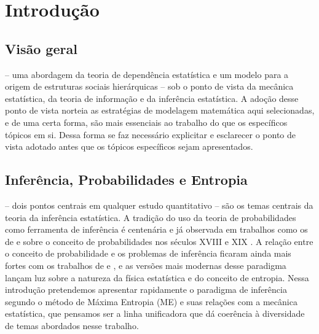 \chapter{Introdução}

\section{Visão geral}
 -- uma abordagem da teoria de dependência estatística e um modelo para a origem de estruturas sociais hierárquicas -- sob o ponto de vista da mecânica estatística, da teoria de informação e da inferência estatística. A adoção desse ponto de vista norteia as estratégias de modelagem matemática aqui selecionadas, e de uma certa forma, são mais essenciais ao trabalho do que os específicos tópicos em si. Dessa forma se faz necessário explicitar e esclarecer o ponto de vista adotado antes que os tópicos específicos sejam apresentados. 

\section{Inferência, Probabilidades e Entropia}
\label{sec:inferencia}

 -- dois pontos centrais em qualquer estudo quantitativo -- são os temas centrais da teoria da inferência estatística. A tradição do uso da teoria de probabilidades como ferramenta de inferência é centenária e já observada em trabalhos como os de \citet{moivre1718} e \citet{laplace1814, laplace1840} sobre o conceito de probabilidades nos séculos XVIII e XIX . A relação entre o conceito de probabilidade e os problemas de inferência ficaram ainda mais fortes com os trabalhos de \citet{Cox1946}\cite[-8cm]{Cox1946,Cox1961} e \citet{Shannon1948}\cite[-5cm]{Shannon1948}, e as versões mais modernas desse paradigma\cite[-3cm]{Jaynes2003} lançam luz sobre a natureza da física estatística e do conceito de entropia\cite{ACaticha2008,ACaticha2009}. Nessa introdução pretendemos apresentar rapidamente o paradigma de inferência segundo o método de Máxima Entropia (ME) e suas relações com a mecânica estatística, que pensamos ser a linha unificadora que dá coerência à diversidade de temas abordados nesse trabalho. 

